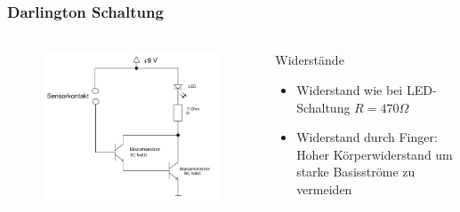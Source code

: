 \begin{frame}
    \frametitle{Darlington Schaltung}
    \framesubtitle{}
    \begin{columns}[c]
        \begin{figure}[H]
        \begin{center}
                \includegraphics[scale=0.3]{./img/schaltungen/darlington.png}
        \end{center}
        \end{figure}
    \begin{block}{Widerstände}
     \begin{itemize}
         \item Widerstand wie bei LED-Schaltung $R = 470 \Omega$
         \item Widerstand durch Finger: Hoher Körperwiderstand um starke
         Basisströme zu vermeiden
     \end{itemize}
    \end{block}
    \end{columns}
\end{frame}
